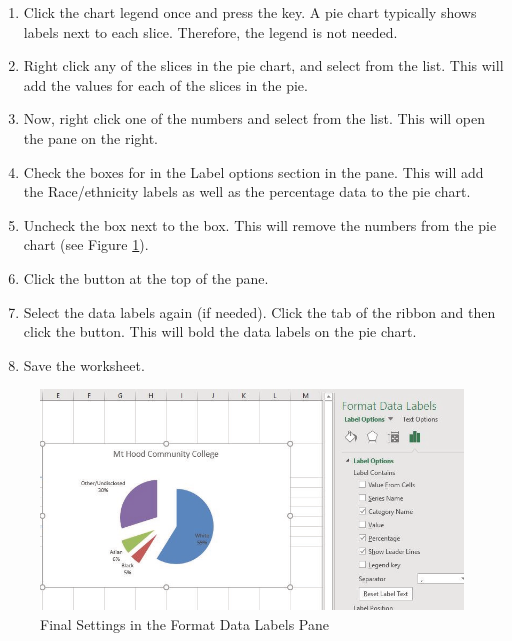 \begin{enumerate}
	\item Click the chart legend once and press the  key. A pie chart typically shows labels next to each slice. Therefore, the legend is not needed.
	\item Right click any of the slices in the pie chart, and select  from the list. This will add the values for each of the slices in the pie.
	\item Now, right click one of the numbers and select  from the list. This will open the  pane on the right.
	\item Check the boxes for  in the Label options section in the  pane. This will add the Race/ethnicity labels as well as the percentage data to the pie chart.
	\item Uncheck the box next to the  box. This will remove the numbers from the pie chart (see Figure \ref{04:fig21}).
	\item Click the  button at the top of the  pane.
	\item Select the data labels again (if needed). Click the  tab of the ribbon and then click the  button. This will bold the data labels on the pie chart.
	\item Save the worksheet.
\end{enumerate}

\begin{figure}[H]
	\centering
	\includegraphics[width=\maxwidth{.95\linewidth}]{gfx/ch04_fig21}
	\caption{Final Settings in the Format Data Labels Pane}
	\label{04:fig21}
\end{figure}

